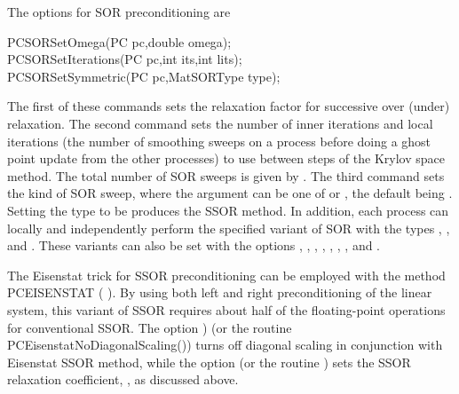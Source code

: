 The options for SOR   
preconditioning are 
\begin{tabbing}
  PCSORSetOmega(PC pc,double omega);\\
  PCSORSetIterations(PC pc,int its,int lits);\\
  PCSORSetSymmetric(PC pc,MatSORType type);
\end{tabbing}
The  
first of these commands sets the relaxation factor for successive
over (under) relaxation.  The second command sets the number of inner
iterations  and local iterations  
(the number of smoothing sweeps on a 
process before doing a ghost point update from the other processes)
to use between steps of the
Krylov space method. The total number of SOR sweeps is given by .
The third command sets the kind of SOR sweep,
where the argument  can be one of  or , the default
being . Setting the type to be  produces the SSOR method.  In addition, 
each process can locally and independently perform the specified 
variant of SOR with the types , 
, and .
These  
variants  
can  
also be set with the options , 
,  ,
,  , 
,  , and 
.
 
 
 

The Eisenstat trick \cite{eisenstat81}  for SSOR preconditioning 
can be employed with the method PCEISENSTAT  
( ).  
By using both left and right preconditioning of the linear system,
this variant of SSOR requires about half of the floating-point operations 
for conventional SSOR.  
 The option 
\break {}) 
(or the routine PCEisenstatNoDiagonalScaling())
turns off diagonal scaling in conjunction with Eisenstat SSOR method, while
the option  (or the routine
)
sets the SSOR relaxation coefficient, , as discussed above.
  


